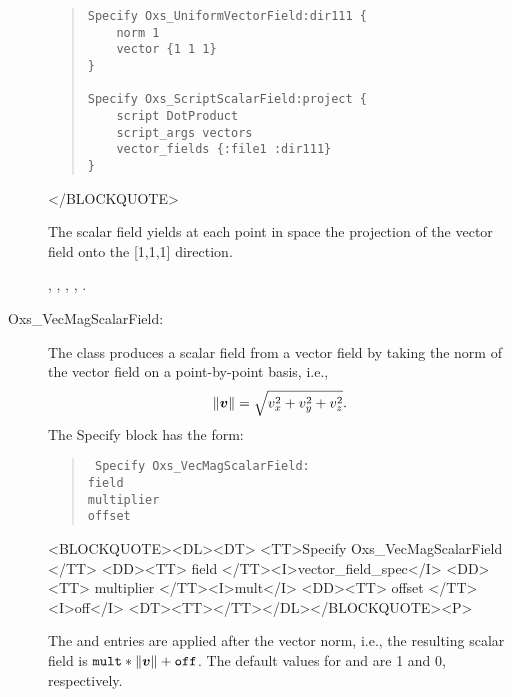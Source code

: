\begin{description}
\begin{quote}
\begin{verbatim}
Specify Oxs_UniformVectorField:dir111 {
    norm 1
    vector {1 1 1}
}

Specify Oxs_ScriptScalarField:project {
    script DotProduct
    script_args vectors
    vector_fields {:file1 :dir111}
}
\end{verbatim}
\end{quote}
\begin{rawhtml}
</BLOCKQUOTE>
\end{rawhtml}
The scalar field  yields at each point in space the
projection of the vector field  onto the [1,1,1] direction.

\begin{ExampleMifs}
  , ,
  , ,
  .
\end{ExampleMifs}

%
\item[Oxs\_VecMagScalarField:]
The  class produces a scalar field
from a vector field by taking the norm of the vector field on a
point-by-point basis, i.e.,
\begin{displaymath}
   \|\mbox{\boldmath $v$}\| = \sqrt{v_x^2+v_y^2+v_z^2}.
\end{displaymath}
The Specify block has the form:
\begin{latexonly}
\begin{quote}\tt
Specify Oxs\_VecMagScalarField: \ocb\\
 \bi field \\
 \bi multiplier \\
 \bi offset \\
\ccb
\end{quote}
\end{latexonly}
\begin{rawhtml}
<BLOCKQUOTE><DL><DT>
<TT>Specify Oxs_VecMagScalarField {</TT>
<DD><TT> field </TT><I>vector_field_spec</I>
<DD><TT> multiplier </TT><I>mult</I>
<DD><TT> offset </TT><I>off</I>
<DT><TT>}</TT></DL></BLOCKQUOTE><P>
\end{rawhtml}
The  and  entries are applied
after the vector norm, i.e., the resulting scalar field is
$\texttt{mult}\ast\|\mbox{\boldmath $v$}\|+\texttt{off}$.  The default values
for  and  are 1 and 0, respectively.


\end{description}
